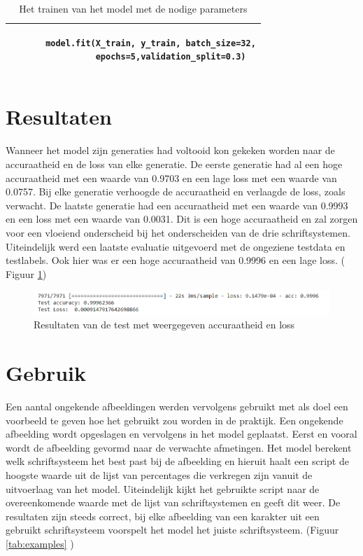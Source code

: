 \begin{table}[!htbp]
    \begin{tabular}{|l|}
        \hline
        \begin{lstlisting}
       model.fit(X_train, y_train, batch_size=32,
                 epochs=5,validation_split=0.3)
        \end{lstlisting}
        \\ \hline
    \end{tabular}
    \caption{Het trainen van het model met de nodige parameters} \label{table:Training}
\end{table}

\section{Resultaten}

Wanneer het model zijn generaties had voltooid kon gekeken worden naar de accuraatheid en de loss van elke generatie.
De eerste generatie had al een hoge accuraatheid met een waarde van 0.9703 en een lage loss met een waarde van 0.0757.
Bij elke generatie verhoogde de accuraatheid en verlaagde de loss, zoals verwacht.
De laatste generatie had een accuraatheid met een waarde van 0.9993 en een loss met een waarde van 0.0031.
Dit is een hoge accuraatheid en zal zorgen voor een vloeiend onderscheid bij het onderscheiden van de drie schriftsystemen.
Uiteindelijk werd een laatste evaluatie uitgevoerd met de ongeziene testdata en testlabels.
Ook hier was er een hoge accuraatheid van 0.9996 en een lage loss. ( Figuur \ref{tab:testResults})

\begin{figure}
    
    
    \includegraphics[width=\linewidth]{img/testResults.png}
    
    \caption{Resultaten van de test met weergegeven accuraatheid en loss}
    \label{tab:testResults}
    
\end{figure}

\section{Gebruik}

Een aantal ongekende afbeeldingen werden vervolgens gebruikt met als doel een voorbeeld te geven hoe het gebruikt zou worden in de praktijk.
Een ongekende afbeelding wordt opgeslagen en vervolgens in het model geplaatst.
Eerst en vooral wordt de afbeelding gevormd naar de verwachte afmetingen.
Het model berekent welk schriftsysteem het best past bij de afbeelding en hieruit haalt een script de hoogste waarde uit de lijst van percentages die verkregen zijn vanuit de uitvoerlaag van het model.
Uiteindelijk kijkt het gebruikte script naar de overeenkomende waarde met de lijst van schriftsystemen en geeft dit weer.
De resultaten zijn steeds correct, bij elke afbeelding van een karakter uit een gebruikt schriftsysteem voorspelt het model het juiste schriftsysteem. (Figuur \ref{tab:examples} )

